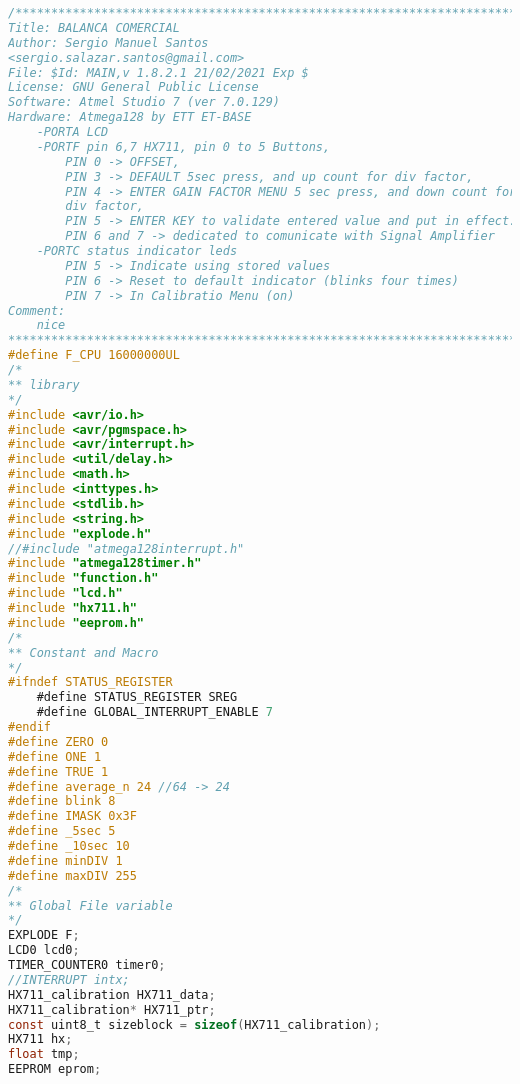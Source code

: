 \begin{lstlisting}[language=C]
/************************************************************************
Title: BALANCA COMERCIAL
Author: Sergio Manuel Santos
<sergio.salazar.santos@gmail.com>
File: $Id: MAIN,v 1.8.2.1 21/02/2021 Exp $
License: GNU General Public License
Software: Atmel Studio 7 (ver 7.0.129)
Hardware: Atmega128 by ETT ET-BASE
    -PORTA LCD
    -PORTF pin 6,7 HX711, pin 0 to 5 Buttons, 
        PIN 0 -> OFFSET, 
        PIN 3 -> DEFAULT 5sec press, and up count for div factor, 
        PIN 4 -> ENTER GAIN FACTOR MENU 5 sec press, and down count for 
        div factor, 
        PIN 5 -> ENTER KEY to validate entered value and put in effect.
        PIN 6 and 7 -> dedicated to comunicate with Signal Amplifier
    -PORTC status indicator leds
        PIN 5 -> Indicate using stored values
        PIN 6 -> Reset to default indicator (blinks four times)
        PIN 7 -> In Calibratio Menu (on)
Comment:
    nice
************************************************************************/
#define F_CPU 16000000UL
/*
** library
*/
#include <avr/io.h>
#include <avr/pgmspace.h>
#include <avr/interrupt.h>
#include <util/delay.h>
#include <math.h>
#include <inttypes.h>
#include <stdlib.h>
#include <string.h>
#include "explode.h"
//#include "atmega128interrupt.h"
#include "atmega128timer.h"
#include "function.h"
#include "lcd.h"
#include "hx711.h"
#include "eeprom.h"
/*
** Constant and Macro
*/
#ifndef STATUS_REGISTER
	#define STATUS_REGISTER SREG
	#define GLOBAL_INTERRUPT_ENABLE 7
#endif
#define ZERO 0
#define ONE 1
#define TRUE 1
#define average_n 24 //64 -> 24
#define blink 8
#define IMASK 0x3F
#define _5sec 5
#define _10sec 10
#define minDIV 1
#define maxDIV 255
/*
** Global File variable
*/
EXPLODE F;
LCD0 lcd0;
TIMER_COUNTER0 timer0;
//INTERRUPT intx;
HX711_calibration HX711_data;
HX711_calibration* HX711_ptr;
const uint8_t sizeblock = sizeof(HX711_calibration);
HX711 hx;
float tmp;
EEPROM eprom;


\end{lstlisting}
